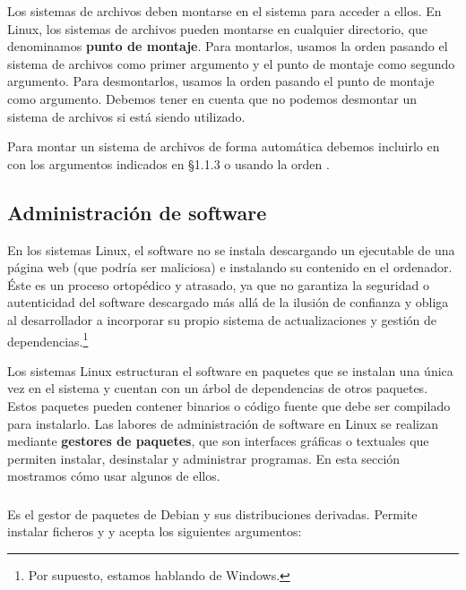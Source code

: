 Los sistemas de archivos deben montarse en el sistema para acceder a ellos.
En Linux, los sistemas de archivos pueden montarse en cualquier directorio, que denominamos \textbf{punto de montaje}.
Para montarlos, usamos la orden  pasando el sistema de archivos como primer argumento y el punto de montaje como segundo argumento.
Para desmontarlos, usamos la orden  pasando el punto de montaje como argumento.
Debemos tener en cuenta que no podemos desmontar un sistema de archivos si está siendo utilizado.

Para montar un sistema de archivos de forma automática debemos incluirlo en  con los argumentos indicados en \S1.1.3 o usando la orden .

\subsection{Administración de software}

En los sistemas Linux, el software no se instala descargando un ejecutable de una página web (que podría ser maliciosa) e instalando su contenido en el ordenador.
Éste es un proceso ortopédico y atrasado, ya que no garantiza la seguridad o autenticidad del software descargado más allá de la ilusión de confianza y obliga al desarrollador a incorporar su propio sistema de actualizaciones y gestión de dependencias.\footnote{Por supuesto, estamos hablando de Windows.}

Los sistemas Linux estructuran el software en paquetes que se instalan una única vez en el sistema y cuentan con un árbol de dependencias de otros paquetes.
Estos paquetes pueden contener binarios o código fuente que debe ser compilado para instalarlo.
Las labores de administración de software en Linux se realizan mediante \textbf{gestores de paquetes}, que son interfaces gráficas o textuales que permiten instalar, desinstalar y administrar programas.
En esta sección mostramos cómo usar algunos de ellos.

\subsubsection{}

Es el gestor de paquetes de Debian y sus distribuciones derivadas.
Permite instalar ficheros  y  y acepta los siguientes argumentos:

